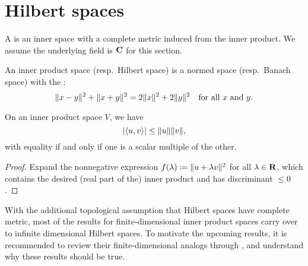 \begin{namedthm}
    
\end{namedthm}

\begin{namedthm}
    
\end{namedthm}

\begin{namedthm}
    
\end{namedthm}

\begin{namedthm}
    
\end{namedthm}

\section{Hilbert spaces}
A  is an inner space with a complete metric induced from the inner product. We assume the underlying field is $\mathbf{C}$ for this section.

\begin{prop}
    An inner product space (resp.\ Hilbert space) is a normed space (resp.\ Banach space) with the : \[
        \lVert x - y \rVert^2 + \lVert x + y \rVert^2 = 2 \lVert x \rVert^2 + 2\lVert y \rVert^2 \quad \text{for all }x\text{ and }y.
    \]
\end{prop}

\begin{namedthm} \label{thm:Cauchy-Schwarz}
    On an inner product space $V$, we have \[
        \lvert \langle u, v \rangle \rvert \leq \lVert u \rVert\lVert v \rVert,
    \] with equality if and only if one is a scalar multiple of the other.
\end{namedthm}
\begin{proof}
    Expand the nonnegative expression $f(\lambda) \coloneqq \lVert u+\lambda v \rVert^2$ for all $\lambda\in \mathbf{R}$, which contains the desired (real part of the) inner product and has discriminant $\leq 0$.
\end{proof}

With the additional topological assumption that Hilbert spaces have complete metric, most of the results for finite-dimensional inner product spaces carry over to infinite dimensional Hilbert spaces. To motivate the upcoming results, it is recommended to review their finite-dimensional analogs through \cite[Section~6]{Axler_2024}, and understand why these results should be true.


